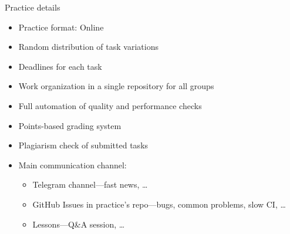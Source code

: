 \documentclass{beamer}
\begin{document}
\begin{frame}{Practice details}
    \begin{itemize}
        \item Practice format: Online
        \item Random distribution of task variations
        \item Deadlines for each task
        \item Work organization in a single repository for all groups
        \item Full automation of quality and performance checks
        \item Points-based grading system
        \item Plagiarism check of submitted tasks
        \item Main communication channel:
            \begin{itemize}
                \item Telegram channel—fast news, \ldots
                \item GitHub Issues in practice's repo—bugs, common problems, slow CI, \ldots
                \item Lessons—Q\&A session, \ldots
            \end{itemize}
    \end{itemize}
\end{frame}
\end{document}

